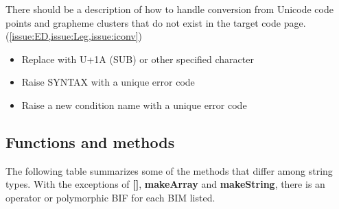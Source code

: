 \documentclass[b4paper]{article}
\begin{document}
There should be a description of how to handle conversion from Unicode code
points and grapheme clusters that do not exist in the target code page.
(\cref{issue:ED,issue:Leg,issue:iconv})
\begin{itemize}
\item Replace with U+1A (SUB) or other specified character
\item Raise SYNTAX with a unique error code
\item Raise a new condition name with a unique error code
\end{itemize}

\subsection{Functions and methods}
The following table summarizes some of the methods that differ among string types. 
With the exceptions of \textbf{{[}{]}}, \textbf{makeArray} and \textbf{makeString},
there is an operator or polymorphic BIF for each BIM listed.
\end{document}
